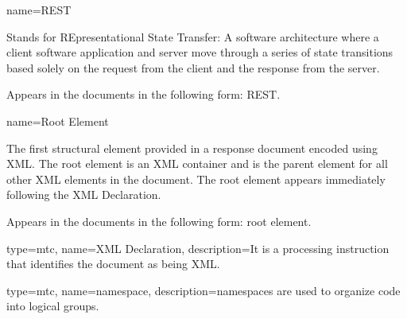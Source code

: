 {
  name={REST}
}
{
	Stands for REpresentational State Transfer:  A software architecture where a client software application and server move through a series of state transitions based solely on the request from the client and the response from the server. 

	Appears in the documents in the following form: REST.
}


{
  name={Root Element}
}
{
	The first \gls{structural element} provided in a \gls{response document} encoded using XML.  The \gls{root element} is an XML container and is the \gls{parent element} for all other XML elements in the document.  The \gls{root element} appears immediately following the XML Declaration.

	Appears in the documents in the following form: \gls{root element}.
}

{
  type=mtc,
  name={XML Declaration},
  description={It is a processing instruction that identifies the document as being XML.}
}

{
  type=mtc,
  name={namespace},
  description={\glspl{namespace} are used to organize code into logical groups.}
}

